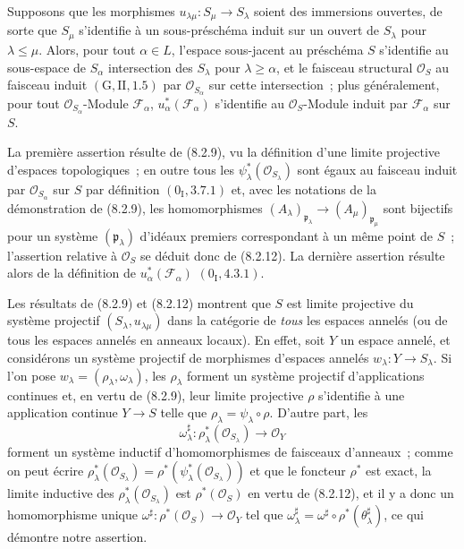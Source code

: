 \begin{proposition}[8.2.13]
\label{IV.8.2.13-fr}
Supposons que les morphismes $u_{\lambda\mu}:S_\mu\to S_\lambda$ soient des
immersions ouvertes, de sorte que $S_\mu$ s'identifie à un sous-préschéma
induit sur un ouvert de $S_\lambda$ pour $\lambda\leq\mu$. Alors, pour tout
$\alpha\in L$, l'espace sous-jacent au préschéma $S$ s'identifie au
sous-espace de $S_\alpha$ intersection des $S_\lambda$ pour
$\lambda\geq\alpha$, et le faisceau structural $\mathcal O_S$ au faisceau
induit $(\mathrm G,\mathrm{II},1.5)$ par $\mathcal O_{S_\alpha}$ sur cette
intersection~; plus généralement, pour tout $\mathcal O_{S_\alpha}$-Module
$\mathscr F_\alpha$, $u_\alpha^*(\mathscr F_\alpha)$ s'identifie au
$\mathcal O_S$-Module induit par $\mathscr F_\alpha$ sur $S$.
\end{proposition}

La première assertion résulte de (8.2.9), vu la définition d'une limite
projective d'espaces topologiques~; en outre tous les
$\psi_\lambda^*(\mathcal O_{S_\lambda})$ sont égaux au faisceau induit par
$\mathcal O_{S_\alpha}$ sur $S$ par définition $(0_{\mathrm I},3.7.1)$ et,
avec les notations de la démonstration de (8.2.9), les homomorphismes
$(A_\lambda)_{\mathfrak p_\lambda}\to
(A_\mu)_{\mathfrak p_\mu}$ sont bijectifs pour un système
$(\mathfrak p_\lambda)$ d'idéaux premiers correspondant à un même point de
$S$~; l'assertion relative à $\mathcal O_S$ se déduit donc de (8.2.12). La
dernière assertion résulte alors de la définition de
$u_\alpha^*(\mathscr F_\alpha)$ $(0_{\mathrm I},4.3.1)$.

\begin{remark}[8.2.14]
\label{IV.8.2.14-fr}
Les résultats de (8.2.9) et (8.2.12) montrent que $S$ est limite projective du
système projectif $(S_\lambda,u_{\lambda\mu})$ dans la catégorie de
\emph{tous} les espaces annelés (ou de tous les espaces annelés en anneaux
locaux). En effet, soit $Y$ un espace annelé, et considérons un système
projectif de morphismes d'espaces annelés $w_\lambda:Y\to S_\lambda$. Si
l'on pose $w_\lambda=(\rho_\lambda,\omega_\lambda)$, les $\rho_\lambda$
forment un système projectif d'applications continues et, en vertu de
(8.2.9), leur limite projective $\rho$ s'identifie à une application continue
$Y\to S$ telle que $\rho_\lambda=\psi_\lambda\circ\rho$. D'autre part, les
\[
\omega_\lambda^\sharp:
\rho_\lambda^*(\mathcal O_{S_\lambda})\to\mathcal O_Y
\]
forment un système inductif d'homomorphismes de faisceaux d'anneaux~; comme
on peut écrire
$\rho_\lambda^*(\mathcal O_{S_\lambda})=
\rho^*(\psi_\lambda^*(\mathcal O_{S_\lambda}))$ et que le foncteur $\rho^*$
est exact, la limite inductive des
$\rho_\lambda^*(\mathcal O_{S_\lambda})$ est $\rho^*(\mathcal O_S)$ en
vertu de (8.2.12), et il y a donc un homomorphisme unique
$\omega^\sharp:\rho^*(\mathcal O_S)\to\mathcal O_Y$ tel que
$\omega_\lambda^\sharp=\omega^\sharp\circ
\rho^*(\theta_\lambda^\sharp)$, ce qui démontre notre assertion.
\end{remark}

